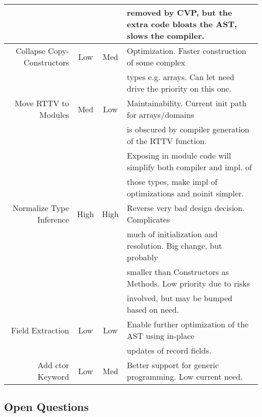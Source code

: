 \begin{tabular}{|r|c|c|l|}
 & & & removed by CVP, but the extra code bloats the AST, slows the compiler. \\ \hline
Collapse Copy-Constructors & Low & Med & Optimization. Faster construction of some complex \\
 & & & types e.g. arrays. Can let need drive the priority on this one. \\ \hline
Move RTTV to Modules & Med & Low & Maintainability. Current init path for arrays/domains \\
 & & & is obscured by compiler generation of the RTTV function. \\
 & & & Exposing in module code will simplify both compiler and impl. of \\
 & & & those types, make impl of optimizations and noinit simpler. \\ \hline
Normalize Type Inference & High & High & Reverse very bad design decision. Complicates \\
 & & & much of initialization and resolution. Big change, but probably \\
 & & & smaller than Constructors as Methods. Low priority due to risks \\
 & & & involved, but may be bumped based on need. \\ \hline
Field Extraction & Low & Low & Enable further optimization of the AST using in-place \\
 & & & updates of record fields. \\ \hline
Add ctor Keyword & Low & Med & Better support for generic programming.  Low current need. \\ \hline
\end{tabular}

\subsection{Open Questions}


